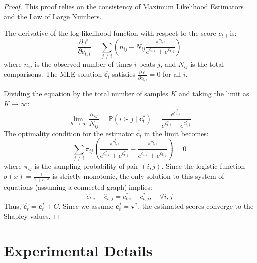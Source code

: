 \documentclass[11pt]{article}
\begin{document}
\begin{proof}
This proof relies on the consistency of Maximum Likelihood Estimators and the Law of Large Numbers.

The derivative of the log-likelihood function with respect to the score $c_{t,i}$ is:
\begin{equation}
    \frac{\partial \ell}{\partial c_{t,i}} = \sum_{j \neq i} \left( n_{ij} - N_{ij} \frac{e^{c_{t,i}}}{e^{c_{t,i}} + e^{c_{t,j}}} \right)
\end{equation}
where $n_{ij}$ is the observed number of times $i$ beats $j$, and $N_{ij}$ is the total comparisons. The MLE solution $\hat{\mathbf{c}_t}$ satisfies $\frac{\partial \ell}{\partial c_{t,i}} = 0$ for all $i$.

Dividing the equation by the total number of samples $K$ and taking the limit as $K \to \infty$:
\begin{equation}
    \lim_{K \to \infty} \frac{n_{ij}}{N_{ij}} = \mathbb{P}(i \succ j \mid \mathbf{c}_t^*) = \frac{e^{c^*_{t,i}}}{e^{c^*_{t,i}} + e^{c^*_{t,j}}}
\end{equation}
The optimality condition for the estimator $\hat{\mathbf{c}_t}$ in the limit becomes:
\begin{equation}
    \sum_{j \neq i} \pi_{ij} \left( \frac{e^{c^*_{t,i}}}{e^{c^*_{t,i}} + e^{c^*_{t,j}}} - \frac{e^{\hat{c}_{t,i}}}{e^{\hat{c}_{t,i}} + e^{\hat{c}_{t,j}}} \right) = 0
\end{equation}
where $\pi_{ij}$ is the sampling probability of pair $(i, j)$.
Since the logistic function $\sigma(x) = \frac{1}{1+e^{-x}}$ is strictly monotonic, the only solution to this system of equations (assuming a connected graph) implies:
\begin{equation}
    \hat{c}_{t,i} - \hat{c}_{t,j} = c^*_{t,i} - c^*_{t,j}, \quad \forall i, j
\end{equation}
Thus, $\hat{\mathbf{c}_t} = \mathbf{c}_t^* + C$. Since we assume $\mathbf{c}_t^* = \boldsymbol{v}^*$, the estimated scores converge to the Shapley values.
\end{proof}

\section{Experimental Details}
\label{appendix:exp_details}
\end{document}
